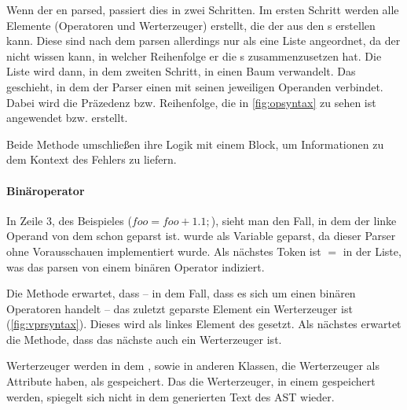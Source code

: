 {{      Wenn der  en parsed, passiert dies in zwei Schritten. Im ersten Schritt werden alle  Elemente (Operatoren und Werterzeuger) erstellt, die der  aus den s erstellen kann. Diese sind nach dem parsen allerdings nur als eine Liste angeordnet, da der  nicht wissen kann, in welcher Reihenfolge er die s zusammenzusetzen hat. Die Liste wird dann, in dem zweiten Schritt, in einen Baum verwandelt. Das geschieht, in dem der Parser einen  mit seinen jeweiligen Operanden verbindet. Dabei wird die Präzedenz bzw. Reihenfolge, die in \autoref{fig:opsyntax} zu sehen ist angewendet bzw. erstellt.

      Beide Methode umschließen ihre Logik mit einem  Block, um Informationen zu dem Kontext des Fehlers zu liefern.

      \paragraph{Binäroperator}
        In Zeile 3, des Beispieles (\myMIn$foo = foo + 1.1;$), sieht man den Fall, in dem der linke Operand von dem  schon geparst ist.  wurde als Variable geparst, da dieser Parser ohne Vorausschauen implementiert wurde. Als nächstes Token ist \myTIn$=$ in der Liste, was das parsen von einem binären Operator indiziert.

        Die  Methode erwartet, dass -- in dem Fall, dass es sich um einen binären Operatoren handelt -- das zuletzt geparste Element ein Werterzeuger ist (\autoref{fig:vprsyntax}). Dieses wird als linkes Element des  gesetzt. Als nächstes erwartet die Methode, dass das nächste  auch ein Werterzeuger ist.

        Werterzeuger werden in dem , sowie in anderen Klassen, die Werterzeuger als Attribute haben, als  gespeichert. Das die Werterzeuger, in einem  gespeichert werden, spiegelt sich nicht in dem generierten Text des AST wieder.

}}
